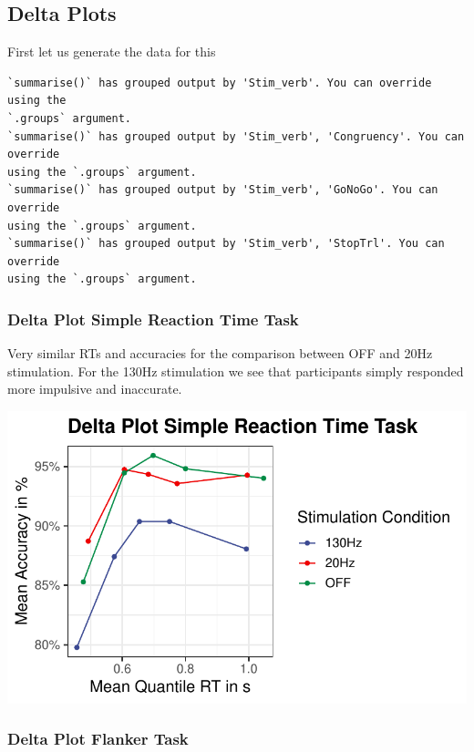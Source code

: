 \documentclass[
  letterpaper,
  DIV=11,
  numbers=noendperiod]{scrartcl}
\begin{document}
\hypertarget{delta-plots}{%
\subsection{Delta Plots}\label{delta-plots}}

First let us generate the data for this

\begin{verbatim}
`summarise()` has grouped output by 'Stim_verb'. You can override using the
`.groups` argument.
`summarise()` has grouped output by 'Stim_verb', 'Congruency'. You can override
using the `.groups` argument.
`summarise()` has grouped output by 'Stim_verb', 'GoNoGo'. You can override
using the `.groups` argument.
`summarise()` has grouped output by 'Stim_verb', 'StopTrl'. You can override
using the `.groups` argument.
\end{verbatim}

\hypertarget{delta-plot-simple-reaction-time-task}{%
\subsubsection{Delta Plot Simple Reaction Time
Task}\label{delta-plot-simple-reaction-time-task}}

Very similar RTs and accuracies for the comparison between OFF and 20Hz
stimulation. For the 130Hz stimulation we see that participants simply
responded more impulsive and inaccurate.

\includegraphics{MF_01_Modelfree_Analysis_files/figure-pdf/unnamed-chunk-12-1.pdf}

\hypertarget{delta-plot-flanker-task}{%
\subsubsection{Delta Plot Flanker Task}\label{delta-plot-flanker-task}}
\end{document}

